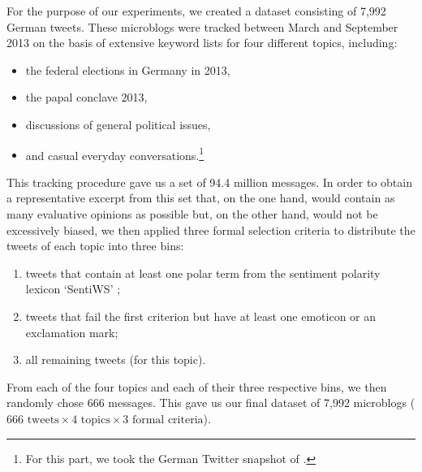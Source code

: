 For the purpose of our experiments, we created a dataset consisting of
7,992 German tweets.  These microblogs were tracked between March and
September 2013 on the basis of extensive keyword lists for four
different topics, including:
\begin{itemize}
\item the federal elections in Germany in 2013,
\item the papal conclave 2013,
\item discussions of general political issues,
\item and casual everyday conversations.\footnote{For this part, we took
  the German Twitter snapshot of \citet{Scheffler:14}.}
\end{itemize}

This tracking procedure gave us a set of 94.4 million messages.  In
order to obtain a representative excerpt from this set that, on the
one hand, would contain as many evaluative opinions as possible but,
on the other hand, would not be excessively biased, we then applied
three formal selection criteria to distribute the tweets of each topic
into three bins:
\begin{enumerate}
\item tweets that
  contain at least one polar term from the sentiment polarity
  lexicon `SentiWS' \cite{Remus:10};
\item tweets that fail the first criterion but have at
  least one emoticon or an exclamation mark;
\item all remaining tweets (for this topic).
\end{enumerate}

From each of the four topics and each of their three respective bins,
we then randomly chose 666 messages. This gave us our final dataset of
7,992 microblogs ($666\text{ tweets} \times 4\text{ topics} \times
3\text{ formal criteria}$).

